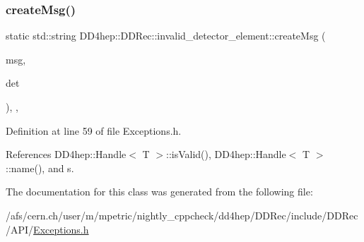 \subsubsection{\texorpdfstring{create\+Msg()}{createMsg()}}
{\footnotesize\ttfamily static std\+::string D\+D4hep\+::\+D\+D\+Rec\+::invalid\+\_\+detector\+\_\+element\+::create\+Msg (\begin{DoxyParamCaption}\item[{const std\+::string \&}]{msg,  }\item[{const \hyperlink{class_d_d4hep_1_1_geometry_1_1_det_element}{Geometry\+::\+Det\+Element} \&}]{det }\end{DoxyParamCaption})\hspace{0.3cm}{\ttfamily [inline]}, {\ttfamily [static]}, {\ttfamily [private]}}



Definition at line 59 of file Exceptions.\+h.



References D\+D4hep\+::\+Handle$<$ T $>$\+::is\+Valid(), D\+D4hep\+::\+Handle$<$ T $>$\+::name(), and s.



The documentation for this class was generated from the following file\+:\begin{DoxyCompactItemize}
\item 
/afs/cern.\+ch/user/m/mpetric/nightly\+\_\+cppcheck/dd4hep/\+D\+D\+Rec/include/\+D\+D\+Rec/\+A\+P\+I/\hyperlink{_d_d_rec_2include_2_d_d_rec_2_a_p_i_2_exceptions_8h}{Exceptions.\+h}\end{DoxyCompactItemize}
